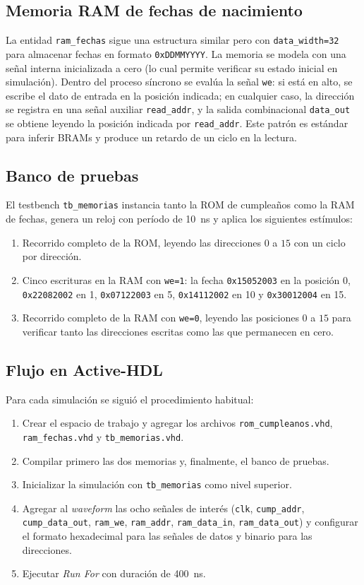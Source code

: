 \documentclass[12pt,letterpaper]{article}
\begin{document}
\subsection{Memoria RAM de fechas de nacimiento}
La entidad \texttt{ram\_fechas} sigue una estructura similar pero con \texttt{data\_width=32} para almacenar fechas en formato \texttt{0xDDMMYYYY}. La memoria se modela con una señal interna inicializada a cero (lo cual permite verificar su estado inicial en simulación). Dentro del proceso síncrono se evalúa la señal \texttt{we}: si está en alto, se escribe el dato de entrada en la posición indicada; en cualquier caso, la dirección se registra en una señal auxiliar \texttt{read\_addr}, y la salida combinacional \texttt{data\_out} se obtiene leyendo la posición indicada por \texttt{read\_addr}. Este patrón es estándar para inferir BRAMs y produce un retardo de un ciclo en la lectura.

\subsection{Banco de pruebas}
El testbench \texttt{tb\_memorias} instancia tanto la ROM de cumpleaños como la RAM de fechas, genera un reloj con período de \SI{10}{\nano\second} y aplica los siguientes estímulos:

\begin{enumerate}
  \item Recorrido completo de la ROM, leyendo las direcciones $0$ a $15$ con un ciclo por dirección.
  \item Cinco escrituras en la RAM con \texttt{we=1}: la fecha \texttt{0x15052003} en la posición 0, \texttt{0x22082002} en 1, \texttt{0x07122003} en 5, \texttt{0x14112002} en 10 y \texttt{0x30012004} en 15.
  \item Recorrido completo de la RAM con \texttt{we=0}, leyendo las posiciones $0$ a $15$ para verificar tanto las direcciones escritas como las que permanecen en cero.
\end{enumerate}

\subsection{Flujo en Active-HDL}
Para cada simulación se siguió el procedimiento habitual:
\begin{enumerate}
  \item Crear el espacio de trabajo y agregar los archivos \texttt{rom\_cumpleanos.vhd}, \texttt{ram\_fechas.vhd} y \texttt{tb\_memorias.vhd}.
  \item Compilar primero las dos memorias y, finalmente, el banco de pruebas.
  \item Inicializar la simulación con \texttt{tb\_memorias} como nivel superior.
  \item Agregar al \textit{waveform} las ocho señales de interés (\texttt{clk}, \texttt{cump\_addr}, \texttt{cump\_data\_out}, \texttt{ram\_we}, \texttt{ram\_addr}, \texttt{ram\_data\_in}, \texttt{ram\_data\_out}) y configurar el formato hexadecimal para las señales de datos y binario para las direcciones.
  \item Ejecutar \textit{Run For} con duración de \SI{400}{\nano\second}.
\end{enumerate}
\end{document}
